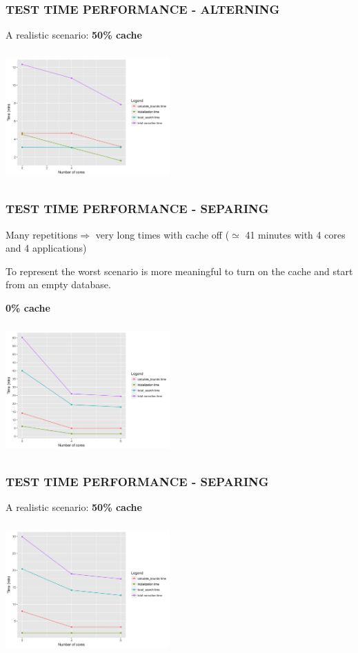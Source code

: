 \documentclass[10pt, compress]{beamer}
\begin{document}
\begin{frame}[fragile]
	\frametitle{TEST TIME PERFORMANCE - ALTERNING}
	A realistic scenario: \textbf{50\% cache}
	
	\hspace{22 mm}
	\includegraphics[width=6.3cm,height=5cm]{images_ready/test1_150_10_0_50pc_a.png}

\end{frame}

\begin{frame}[fragile]
	\frametitle{TEST TIME PERFORMANCE - SEPARING}
	
	Many repetitions$\Rightarrow$ very long times with cache off ($\simeq$ 41 minutes with 4 cores and 4 applications)
	
	To represent the worst scenario is more meaningful to turn on the cache and start from an empty database.
	
	\textbf{0\% cache}
	
	\hspace{22 mm}
	\includegraphics[width=6.3cm,height=5cm]{images_ready/test1_150_10_0_0pc_s.png}
	
	
	
\end{frame}


\begin{frame}[fragile]
	\frametitle{TEST TIME PERFORMANCE - SEPARING}
	A realistic scenario: \textbf{50\% cache}
	
	\hspace{22 mm}
	\includegraphics[width=6.3cm,height=5cm]{images_ready/test1_150_10_0_50pc_s.png}
	
	
	
\end{frame}
\end{document}
